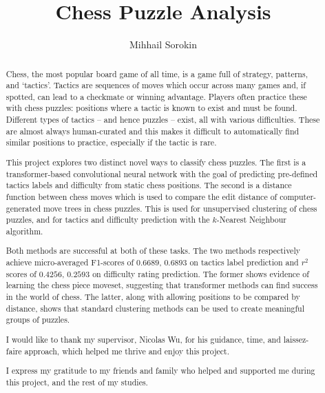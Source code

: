 \documentclass[a4paper, twoside]{report}
\title{Chess Puzzle Analysis}
\author{Mihhail Sorokin}
\begin{document}



\begin{abstract}

  Chess, the most popular board game of all time, is a game full of strategy,
  patterns, and `tactics'. Tactics are sequences of moves which occur across
  many games and, if spotted, can lead to a checkmate or winning advantage.
  Players often practice these with chess puzzles: positions where a tactic is
  known to exist and must be found. Different types of tactics -- and hence
  puzzles -- exist, all with various difficulties. These are almost always
  human-curated and this makes it difficult to automatically find similar
  positions to practice, especially if the tactic is rare.

  This project explores two distinct novel ways to classify chess puzzles. The
  first is a transformer-based convolutional neural network with the goal of
  predicting pre-defined tactics labels and difficulty from static chess
  positions. The second is a distance function between chess moves which is
  used to compare the edit distance of computer-generated move trees in chess
  puzzles. This is used for unsupervised clustering of chess puzzles, and for
  tactics and difficulty prediction with the $k$-Nearest Neighbour algorithm.

  Both methods are successful at both of these tasks. The two methods
  respectively achieve micro-averaged F1-scores of $0.6689$, $0.6893$ on
  tactics label prediction and $r^2$ scores of $0.4256$, $0.2593$ on difficulty
  rating prediction. The former shows evidence of learning the chess piece
  moveset, suggesting that transformer methods can find success in the world of
  chess. The latter, along with allowing positions to be compared by distance,
  shows that standard clustering methods can be used to create meaningful
  groups of puzzles.

\end{abstract}

\renewcommand{\abstractname}{Acknowledgements}
\begin{abstract}

  I would like to thank my supervisor, Nicolas Wu, for his guidance, time, and
  laissez-faire approach, which helped me thrive and enjoy this project.

  I express my gratitude to my friends and family who helped and supported
  me during this project, and the rest of my studies. 

\end{abstract}
\end{document}
